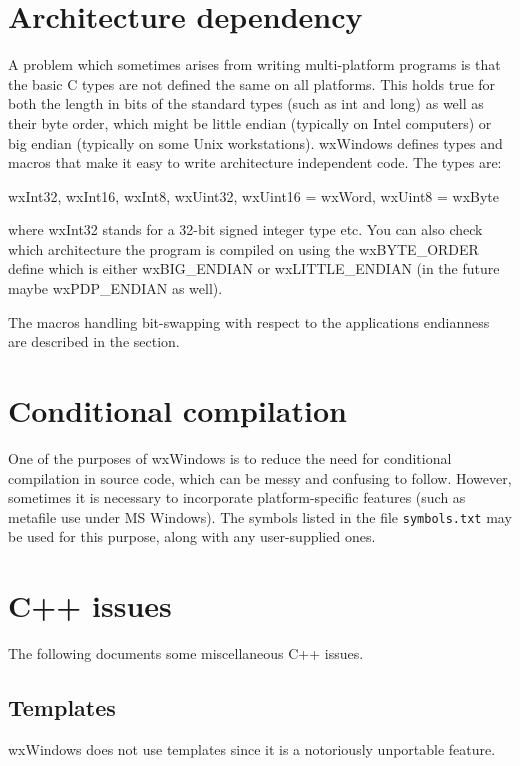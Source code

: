 \section{Architecture dependency}

A problem which sometimes arises from writing multi-platform programs is that
the basic C types are not defined the same on all platforms. This holds true
for both the length in bits of the standard types (such as int and long) as 
well as their byte order, which might be little endian (typically
on Intel computers) or big endian (typically on some Unix workstations). wxWindows
defines types and macros that make it easy to write architecture independent
code. The types are:

wxInt32, wxInt16, wxInt8, wxUint32, wxUint16 = wxWord, wxUint8 = wxByte

where wxInt32 stands for a 32-bit signed integer type etc. You can also check
which architecture the program is compiled on using the wxBYTE\_ORDER define
which is either wxBIG\_ENDIAN or wxLITTLE\_ENDIAN (in the future maybe wxPDP\_ENDIAN
as well).

The macros handling bit-swapping with respect to the applications endianness
are described in the  section.

\section{Conditional compilation}

One of the purposes of wxWindows is to reduce the need for conditional
compilation in source code, which can be messy and confusing to follow.
However, sometimes it is necessary to incorporate platform-specific
features (such as metafile use under MS Windows). The symbols
listed in the file {\tt symbols.txt} may be used for this purpose,
along with any user-supplied ones.

\section{C++ issues}

The following documents some miscellaneous C++ issues.

\subsection{Templates}

wxWindows does not use templates since it is a notoriously unportable feature.

